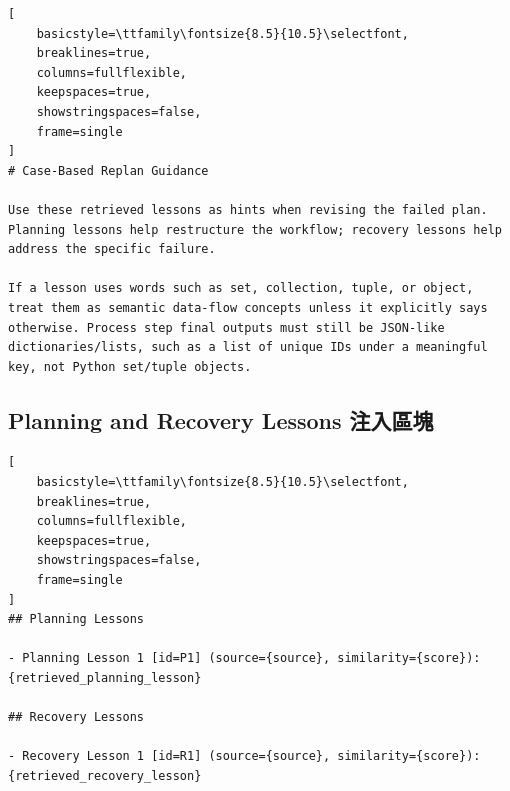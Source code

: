 \begin{lstlisting}[
    basicstyle=\ttfamily\fontsize{8.5}{10.5}\selectfont,
    breaklines=true,
    columns=fullflexible,
    keepspaces=true,
    showstringspaces=false,
    frame=single
]
# Case-Based Replan Guidance

Use these retrieved lessons as hints when revising the failed plan. Planning lessons help restructure the workflow; recovery lessons help address the specific failure.

If a lesson uses words such as set, collection, tuple, or object, treat them as semantic data-flow concepts unless it explicitly says otherwise. Process step final outputs must still be JSON-like dictionaries/lists, such as a list of unique IDs under a meaningful key, not Python set/tuple objects.
\end{lstlisting}

\subsection*{Planning and Recovery Lessons 注入區塊}

\begin{lstlisting}[
    basicstyle=\ttfamily\fontsize{8.5}{10.5}\selectfont,
    breaklines=true,
    columns=fullflexible,
    keepspaces=true,
    showstringspaces=false,
    frame=single
]
## Planning Lessons

- Planning Lesson 1 [id=P1] (source={source}, similarity={score}):
{retrieved_planning_lesson}

## Recovery Lessons

- Recovery Lesson 1 [id=R1] (source={source}, similarity={score}):
{retrieved_recovery_lesson}
\end{lstlisting}
